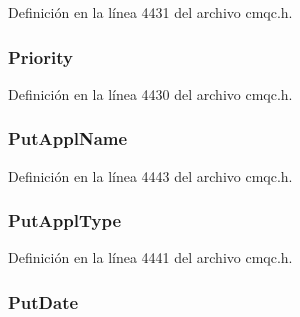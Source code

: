 Definición en la línea 4431 del archivo cmqc.\+h.

\hypertarget{structtag_m_q_m_d_a72c542b9e2952a489df0cb84755c1fa6}{}
\subsubsection[{Priority}]{ Priority}\label{structtag_m_q_m_d_a72c542b9e2952a489df0cb84755c1fa6}


Definición en la línea 4430 del archivo cmqc.\+h.

\hypertarget{structtag_m_q_m_d_a7195390be27f384ef0ab0d0f9053d462}{}
\subsubsection[{Put\+Appl\+Name}]{ Put\+Appl\+Name}\label{structtag_m_q_m_d_a7195390be27f384ef0ab0d0f9053d462}


Definición en la línea 4443 del archivo cmqc.\+h.

\hypertarget{structtag_m_q_m_d_a6d9e0e0fe9075017c939213948c747dc}{}
\subsubsection[{Put\+Appl\+Type}]{ Put\+Appl\+Type}\label{structtag_m_q_m_d_a6d9e0e0fe9075017c939213948c747dc}


Definición en la línea 4441 del archivo cmqc.\+h.

\hypertarget{structtag_m_q_m_d_add3e7fe139edfa323295d6c7bc764cc5}{}
\subsubsection[{Put\+Date}]{ Put\+Date}\label{structtag_m_q_m_d_add3e7fe139edfa323295d6c7bc764cc5}


